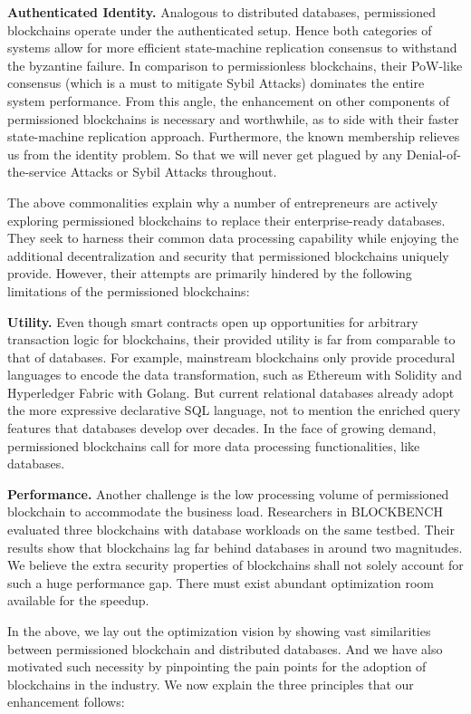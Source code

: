 \textbf{Authenticated Identity. } 
Analogous to distributed databases, permissioned blockchains operate under the authenticated setup.
Hence both categories of systems allow for more efficient state-machine replication consensus to withstand the byzantine failure. 
In comparison to permissionless blockchains, their PoW-like consensus (which is a must to mitigate Sybil Attacks) dominates the entire system performance. 
From this angle, the enhancement on other components of permissioned blockchains is necessary and worthwhile, as to side with their faster state-machine replication approach. 
Furthermore, the known membership relieves us from the identity problem. 
So that we will never get plagued by any Denial-of-the-service Attacks or Sybil Attacks throughout. 

The above commonalities explain why a number of entrepreneurs are actively exploring permissioned blockchains to replace their enterprise-ready databases. 
They seek to harness their common data processing capability while enjoying the additional decentralization and security that permissioned blockchains uniquely provide. 
However, their attempts are primarily hindered by the following limitations of the permissioned blockchains:

\textbf{Utility. }
Even though smart contracts open up opportunities for arbitrary transaction logic for blockchains, their provided utility is far from comparable to that of databases. 
For example, mainstream blockchains only provide procedural languages to encode the data transformation, such as Ethereum with Solidity and Hyperledger Fabric with Golang. 
But current relational databases already adopt the more expressive declarative SQL language, not to mention the enriched query features that databases develop over decades. 
In the face of growing demand, permissioned blockchains call for more data processing functionalities, like databases. 

\textbf{Performance. }
Another challenge is the low processing volume of permissioned blockchain to accommodate the business load. 
Researchers in BLOCKBENCH evaluated three blockchains with database workloads on the same testbed. 
Their results show that blockchains lag far behind databases in around two magnitudes. 
We believe the extra security properties of blockchains shall not solely account for such a huge performance gap. 
There must exist abundant optimization room available for the speedup. 

In the above, we lay out the optimization vision by showing vast similarities between permissioned blockchain and distributed databases. 
And we have also motivated such necessity by pinpointing the pain points for the adoption of blockchains in the industry. 
We now explain the three principles that our enhancement follows:

